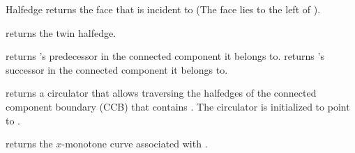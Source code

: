 \begin{ccRefClass}{Halfedge}
    {returns the face that \ccVar{} is incident to (The face lies to
    the left of ).}

    {returns the twin halfedge.}

    {returns \ccVar{}'s predecessor in the connected component it belongs to.}
\ccGlue
{}
    {returns \ccVar{}'s successor in the connected component it belongs to.}

    {returns a circulator that allows traversing the halfedges of the
     connected component boundary (CCB) that contains \ccVar{}.
     The circulator is initialized to point to \ccVar{}.}

    {returns the $x$-monotone curve associated with \ccVar{}.
     }

\end{ccRefClass}

\ccRefPageEnd
